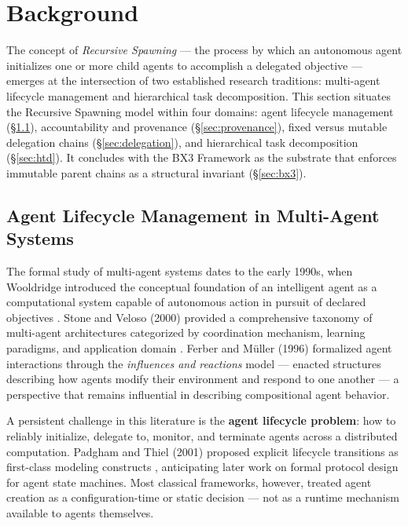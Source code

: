 \section{Background}

The concept of \textit{Recursive Spawning} — the process by which an autonomous agent initializes one or more child agents to accomplish a delegated objective — emerges at the intersection of two established research traditions: multi-agent lifecycle management and hierarchical task decomposition. This section situates the Recursive Spawning model within four domains: agent lifecycle management (\S\ref{sec:lifecycle}), accountability and provenance (\S\ref{sec:provenance}), fixed versus mutable delegation chains (\S\ref{sec:delegation}), and hierarchical task decomposition (\S\ref{sec:htd}). It concludes with the BX3 Framework as the substrate that enforces immutable parent chains as a structural invariant (\S\ref{sec:bx3}).

\subsection{Agent Lifecycle Management in Multi-Agent Systems}
\label{sec:lifecycle}

The formal study of multi-agent systems dates to the early 1990s, when Wooldridge introduced the conceptual foundation of an intelligent agent as a computational system capable of autonomous action in pursuit of declared objectives \cite{wooldridge1995}. Stone and Veloso (2000) provided a comprehensive taxonomy of multi-agent architectures categorized by coordination mechanism, learning paradigms, and application domain \cite{stone2000}. Ferber and M\"uller (1996) formalized agent interactions through the \textit{influences and reactions} model — enacted structures describing how agents modify their environment and respond to one another \cite{ferber1996} — a perspective that remains influential in describing compositional agent behavior.

A persistent challenge in this literature is the \textbf{agent lifecycle problem}: how to reliably initialize, delegate to, monitor, and terminate agents across a distributed computation. Padgham and Thiel (2001) proposed explicit lifecycle transitions as first-class modeling constructs \cite{padgham2001}, anticipating later work on formal protocol design for agent state machines. Most classical frameworks, however, treated agent creation as a configuration-time or static decision — not as a runtime mechanism available to agents themselves.

